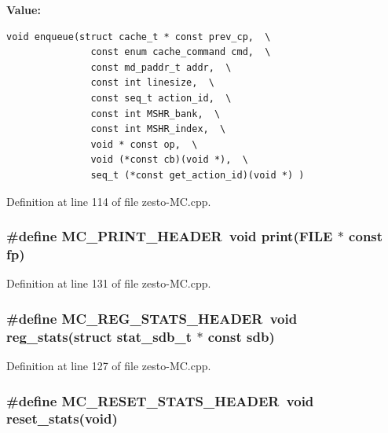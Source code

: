 \textbf{Value:}

\begin{Code}\begin{verbatim}void enqueue(struct cache_t * const prev_cp,  \
               const enum cache_command cmd,  \
               const md_paddr_t addr,  \
               const int linesize,  \
               const seq_t action_id,  \
               const int MSHR_bank,  \
               const int MSHR_index,  \
               void * const op,  \
               void (*const cb)(void *),  \
               seq_t (*const get_action_id)(void *) )
\end{verbatim}
\end{Code}


Definition at line 114 of file zesto-MC.cpp.
\subsubsection[{MC\_\-PRINT\_\-HEADER}]{\setlength{\rightskip}{0pt plus 5cm}\#define MC\_\-PRINT\_\-HEADER~void print(FILE $\ast$ const fp)}\label{zesto-MC_8cpp_264ca98e6a6b2705e31e8739b3560411}




Definition at line 131 of file zesto-MC.cpp.
\subsubsection[{MC\_\-REG\_\-STATS\_\-HEADER}]{\setlength{\rightskip}{0pt plus 5cm}\#define MC\_\-REG\_\-STATS\_\-HEADER~void reg\_\-stats(struct {\bf stat\_\-sdb\_\-t} $\ast$ const sdb)}\label{zesto-MC_8cpp_8ee6f14ebca639c758ebd0da1f4223e6}




Definition at line 127 of file zesto-MC.cpp.
\subsubsection[{MC\_\-RESET\_\-STATS\_\-HEADER}]{\setlength{\rightskip}{0pt plus 5cm}\#define MC\_\-RESET\_\-STATS\_\-HEADER~void reset\_\-stats(void)}\label{zesto-MC_8cpp_6e8b7d22fd959f6324510d2f308e458e}




